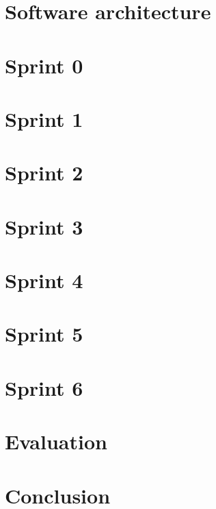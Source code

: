\documentclass[11pt]{report}
\begin{document}
\chapter{Software architecture}


\chapter{Sprint 0}


\chapter{Sprint 1}


\chapter{Sprint 2}


\chapter{Sprint 3}


\chapter{Sprint 4}


\chapter{Sprint 5}


\chapter{Sprint 6}


\chapter{Evaluation}


\chapter{Conclusion}


\begin{flushleft}
	
	
\end{flushleft}

\appendix

\end{document}

